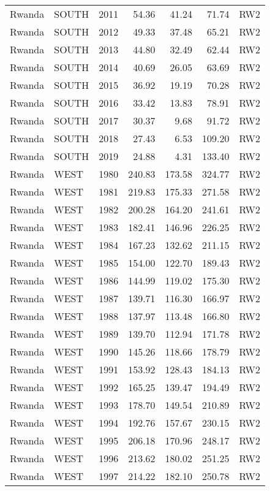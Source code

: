 \begin{longtable}{lllrrrl}
  Rwanda & SOUTH & 2011 & 54.36 & 41.24 & 71.74 & RW2 \\ 
  Rwanda & SOUTH & 2012 & 49.33 & 37.48 & 65.21 & RW2 \\ 
  Rwanda & SOUTH & 2013 & 44.80 & 32.49 & 62.44 & RW2 \\ 
  Rwanda & SOUTH & 2014 & 40.69 & 26.05 & 63.69 & RW2 \\ 
  Rwanda & SOUTH & 2015 & 36.92 & 19.19 & 70.28 & RW2 \\ 
  Rwanda & SOUTH & 2016 & 33.42 & 13.83 & 78.91 & RW2 \\ 
  Rwanda & SOUTH & 2017 & 30.37 & 9.68 & 91.72 & RW2 \\ 
  Rwanda & SOUTH & 2018 & 27.43 & 6.53 & 109.20 & RW2 \\ 
  Rwanda & SOUTH & 2019 & 24.88 & 4.31 & 133.40 & RW2 \\ 
  Rwanda & WEST & 1980 & 240.83 & 173.58 & 324.77 & RW2 \\ 
  Rwanda & WEST & 1981 & 219.83 & 175.33 & 271.58 & RW2 \\ 
  Rwanda & WEST & 1982 & 200.28 & 164.20 & 241.61 & RW2 \\ 
  Rwanda & WEST & 1983 & 182.41 & 146.96 & 226.25 & RW2 \\ 
  Rwanda & WEST & 1984 & 167.23 & 132.62 & 211.15 & RW2 \\ 
  Rwanda & WEST & 1985 & 154.00 & 122.70 & 189.43 & RW2 \\ 
  Rwanda & WEST & 1986 & 144.99 & 119.02 & 175.30 & RW2 \\ 
  Rwanda & WEST & 1987 & 139.71 & 116.30 & 166.97 & RW2 \\ 
  Rwanda & WEST & 1988 & 137.97 & 113.48 & 166.80 & RW2 \\ 
  Rwanda & WEST & 1989 & 139.70 & 112.94 & 171.78 & RW2 \\ 
  Rwanda & WEST & 1990 & 145.26 & 118.66 & 178.79 & RW2 \\ 
  Rwanda & WEST & 1991 & 153.92 & 128.43 & 184.13 & RW2 \\ 
  Rwanda & WEST & 1992 & 165.25 & 139.47 & 194.49 & RW2 \\ 
  Rwanda & WEST & 1993 & 178.70 & 149.54 & 210.89 & RW2 \\ 
  Rwanda & WEST & 1994 & 192.76 & 157.67 & 230.15 & RW2 \\ 
  Rwanda & WEST & 1995 & 206.18 & 170.96 & 248.17 & RW2 \\ 
  Rwanda & WEST & 1996 & 213.62 & 180.02 & 251.25 & RW2 \\ 
  Rwanda & WEST & 1997 & 214.22 & 182.10 & 250.78 & RW2 \\ 

\end{longtable}
